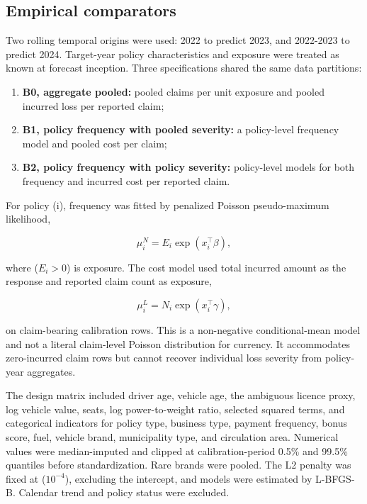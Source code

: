 \subsection{Empirical comparators}\label{sec:empirical-comparators}

Two rolling temporal origins were used: 2022 to predict 2023, and 2022-2023 to predict 2024. Target-year policy characteristics and exposure were treated as known at forecast inception. Three specifications shared the same data partitions:

\begin{enumerate}[leftmargin=*]
\item \textbf{B0, aggregate pooled:} pooled claims per unit exposure and pooled incurred loss per reported claim;
\item \textbf{B1, policy frequency with pooled severity:} a policy-level frequency model and pooled cost per claim;
\item \textbf{B2, policy frequency with policy severity:} policy-level models for both frequency and incurred cost per reported claim.
\end{enumerate}

For policy (i), frequency was fitted by penalized Poisson pseudo-maximum likelihood,

\begin{equation}
\mu_i^{N}=E_i\exp(x_i^{\top}\beta),
\label{eq:1}
\end{equation}

where ($E_i>0$) is exposure. The cost model used total incurred amount as the response and reported claim count as exposure,

\begin{equation}
\mu_i^{L}=N_i\exp(x_i^{\top}\gamma),
\label{eq:2}
\end{equation}

on claim-bearing calibration rows. This is a non-negative conditional-mean model and not a literal claim-level Poisson distribution for currency. It accommodates zero-incurred claim rows but cannot recover individual loss severity from policy-year aggregates.

The design matrix included driver age, vehicle age, the ambiguous licence proxy, log vehicle value, seats, log power-to-weight ratio, selected squared terms, and categorical indicators for policy type, business type, payment frequency, bonus score, fuel, vehicle brand, municipality type, and circulation area. Numerical values were median-imputed and clipped at calibration-period 0.5\% and 99.5\% quantiles before standardization. Rare brands were pooled. The L2 penalty was fixed at ($10^{-4}$), excluding the intercept, and models were estimated by L-BFGS-B. Calendar trend and policy status were excluded.


